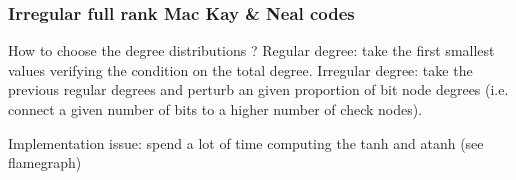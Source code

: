 \subsubsection{Irregular full rank Mac Kay \& Neal codes}


How to choose the degree distributions ? Regular degree: take the first smallest
values verifying the condition on the total degree. Irregular degree: take the
previous regular degrees and perturb an given proportion of bit node degrees
(i.e. connect a given number of bits to a higher number of check nodes).

Implementation issue: spend a lot of time computing the tanh and atanh (see
flamegraph)